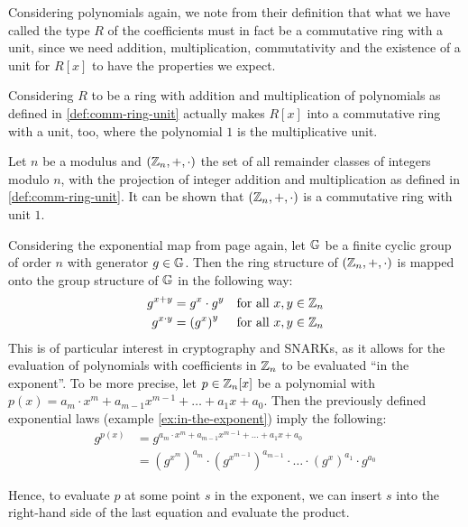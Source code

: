 \begin{example} Considering polynomials again, we note from their definition that what we have called the type $R$ of the coefficients must in fact be a commutative ring with a unit, since we need addition, multiplication, commutativity and the existence of a unit for $R[x]$ to have the properties we expect.

Considering $R$ to be a ring with addition and multiplication of polynomials as defined in \ref{def:comm-ring-unit} actually makes $R[x]$ into a commutative ring with a unit, too, where the polynomial $1$ is the multiplicative unit.
\end{example}
\begin{example} Let $n$ be a modulus and $(\mathbb{Z}_n,+,\cdot)$ the set of all remainder classes of integers modulo $n$, with the projection of integer addition and multiplication as defined in \ref{def:comm-ring-unit}. It can be shown that $(\mathbb{Z}_n,+,\cdot)$ is a commutative ring with unit $1$.
\end{example}
Considering the exponential map from page \pageref{exponentialmap}  again, let $\mathbb{G}$ be a finite cyclic group of order $n$ with generator $g\in\mathbb{G}$. Then the ring structure of $(\mathbb{Z}_n,+,\cdot)$ is mapped onto the group structure of $\mathbb{G}$ in the following way:
\begin{align*}
g^{x+y} &= g^x\cdot g^y & \text{for all } x,y\in\mathbb{Z}_n\\
g^{x\cdot y} &= \left( g^x\right)^y & \text{for all } x,y\in\mathbb{Z}_n
\end{align*}
This is of particular interest in cryptography and SNARKs, as it allows for the evaluation of polynomials with coefficients in $\mathbb{Z}_n$ to be evaluated ``in the exponent''. To be more precise, let $p\in \mathbb{Z}_n[x]$ be a polynomial with $p(x)=a_m\cdot x^m+a_{m-1}x^{m-1}+\ldots + a_1x +a_0$. Then the previously defined exponential laws (example \ref{ex:in-the-exponent}) imply the following:
\begin{align*}
g^{p(x)} & = g^{a_m\cdot x^m+a_{m-1}x^{m-1}+\ldots + a_1x +a_0}\\
         & = \left(g^{x^m}\right)^{a_m}\cdot \left(g^{x^{m-1}}\right)^{a_{m-1}}\cdot \ldots\cdot \left(g^{x}\right)^{a_1}\cdot g^{a_0}
\end{align*}

Hence, to evaluate $p$ at some point $s$ in the exponent, we can insert $s$ into the right-hand side of the last equation and evaluate the product.

